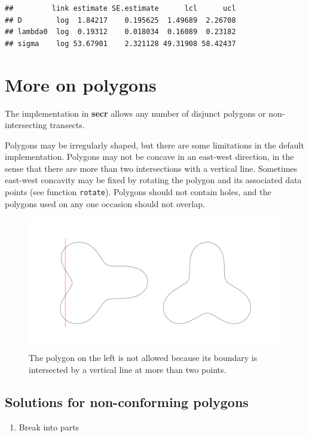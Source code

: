 \documentclass[
]{book}
\providecommand{\tightlist}{%
  \setlength{\itemsep}{0pt}\setlength{\parskip}{0pt}}
\begin{document}
\begin{verbatim}
##         link estimate SE.estimate      lcl      ucl
## D        log  1.84217    0.195625  1.49689  2.26708
## lambda0  log  0.19312    0.018034  0.16089  0.23182
## sigma    log 53.67901    2.321128 49.31908 58.42437
\end{verbatim}

\section{More on polygons}\label{polygonshape}

The implementation in \textbf{secr} allows any number of disjunct polygons or non-intersecting transects.

Polygons may be irregularly shaped, but there are some limitations in the default implementation. Polygons may not be concave in an east-west direction, in the sense that there are more than two intersections with a vertical
line. Sometimes east-west concavity may be fixed by rotating the polygon and its associated data points (see function
\texttt{rotate}). Polygons should not contain holes, and the polygons used on any one occasion should not overlap.



\begin{figure}
\includegraphics[width=0.9\linewidth]{figures/irregular} \caption{The polygon on the left is not allowed because its boundary is intersected by a vertical line at more than two points.}\label{fig:irregular}
\end{figure}

\subsection{Solutions for non-conforming polygons}\label{solutions-for-non-conforming-polygons}

\begin{enumerate}
\def\labelenumi{\arabic{enumi}.}
\tightlist
\item
  Break into parts
\end{enumerate}
\end{document}
